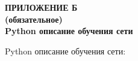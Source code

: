 \clearpage
{}%
\par

\normalsize
\begin{center}
  \textbf{ПРИЛОЖЕНИЕ Б} \\
  \textbf{(обязательное)} \\
  \textbf{Python описание обучения сети}
\end{center}

Python описание обучения сети:





% 

% 
